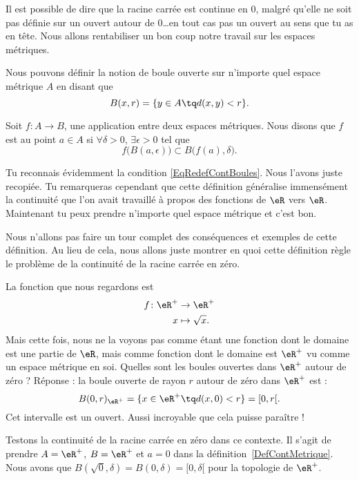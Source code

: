 Il est possible de dire que la racine carrée est continue en $0$, malgré qu'elle ne soit pas définie sur un ouvert autour de $0$\ldots en tout cas pas un ouvert au sens que tu as en tête. Nous allons rentabiliser un bon coup notre travail sur les espaces métriques.

Nous pouvons définir la notion de boule ouverte sur n'importe quel espace métrique $A$ en disant que
\[
  B(x,r)=\{ y\in A\tq d(x,y)<r \}.
\]
\begin{definition}      \label{DefContMetrique}
Soit $f\colon A\to B$, une application entre deux espaces métriques. Nous disons que $f$ est  au point $a\in A$ si $\forall \delta>0$, $\exists\epsilon>0$ tel que
\begin{equation}
  f\big( B(a,\epsilon) \big)\subset B\big( f(a),\delta \big).
\end{equation}
\end{definition}
Tu reconnais évidemment la condition \eqref{EqRedefContBoules}. Nous l'avons juste recopiée. Tu remarqueras cependant que cette définition généralise immensément la continuité que l'on avait travaillé à propos des fonctions de $\eR$ vers $\eR$. Maintenant tu peux prendre n'importe quel espace métrique et c'est bon.

Nous n'allons pas faire un tour complet des conséquences et exemples de cette définition. Au lieu de cela, nous allons juste montrer en quoi cette définition règle le problème de la continuité de la racine carrée en zéro.

La fonction que nous regardons est
\begin{equation}
\begin{aligned}
f \colon \eR^+&\to \eR^+ \\
   x&\mapsto \sqrt{x}.
\end{aligned}
\end{equation}
Mais cette fois, nous ne la voyons pas comme étant une fonction dont le domaine est une partie de $\eR$, mais comme fonction dont le domaine est $\eR^+$ vu comme un espace métrique en soi. Quelles sont les boules ouvertes dans $\eR^+$ autour de zéro ? Réponse : la boule ouverte de rayon $r$ autour de zéro dans $\eR^+$ est :
\[
  B(0,r)_{\eR^+}=\{ x\in\eR^+\tq d(x,0)<r \}=[0,r[.
\]
Cet intervalle est un ouvert. Aussi incroyable que cela puisse paraître !

Testons la continuité de la racine carrée en zéro dans ce contexte. Il s'agit de prendre $A=\eR^+$, $B=\eR^+$ et $a=0$ dans la définition~\ref{DefContMetrique}. Nous avons que $B(\sqrt{0},\delta)=B(0,\delta)=[0,\delta[$ pour la topologie de $\eR^+$.

